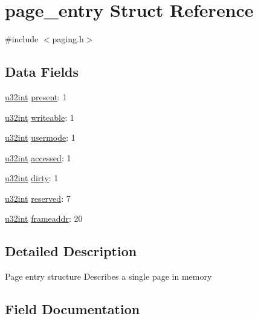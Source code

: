 \hypertarget{structpage__entry}{}\section{page\+\_\+entry Struct Reference}
\label{structpage__entry}


{\ttfamily \#include $<$paging.\+h$>$}

\subsection*{Data Fields}
\begin{DoxyCompactItemize}
\item 
\hyperlink{system_8h_a757de76cafbcddaac0d1632902fe4cb8}{u32int} \hyperlink{structpage__entry_a69718d61bbe7faf204d90744c9824c52}{present}\+: 1
\item 
\hyperlink{system_8h_a757de76cafbcddaac0d1632902fe4cb8}{u32int} \hyperlink{structpage__entry_a421725c39c0745b022f36ab85b6cf3ce}{writeable}\+: 1
\item 
\hyperlink{system_8h_a757de76cafbcddaac0d1632902fe4cb8}{u32int} \hyperlink{structpage__entry_a277f6a1db251178ac4c5bd2e58acf139}{usermode}\+: 1
\item 
\hyperlink{system_8h_a757de76cafbcddaac0d1632902fe4cb8}{u32int} \hyperlink{structpage__entry_afb99a0327fa4c7332208a4c69586c8ec}{accessed}\+: 1
\item 
\hyperlink{system_8h_a757de76cafbcddaac0d1632902fe4cb8}{u32int} \hyperlink{structpage__entry_a3a32ba260115f27563a8197f17c291a6}{dirty}\+: 1
\item 
\hyperlink{system_8h_a757de76cafbcddaac0d1632902fe4cb8}{u32int} \hyperlink{structpage__entry_a428bdea224227681cbba9cb45f3cca62}{reserved}\+: 7
\item 
\hyperlink{system_8h_a757de76cafbcddaac0d1632902fe4cb8}{u32int} \hyperlink{structpage__entry_a95b631ccb680a6af3d4d4a4fda3ca440}{frameaddr}\+: 20
\end{DoxyCompactItemize}


\subsection{Detailed Description}
Page entry structure Describes a single page in memory 

\subsection{Field Documentation}
